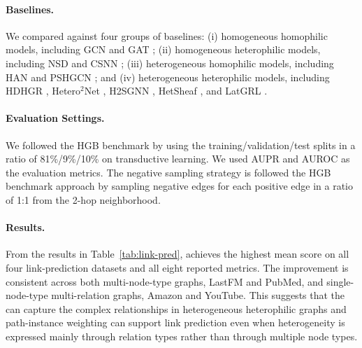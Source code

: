 \paragraph{Baselines.} We compared \method{} against four groups of baselines: (i) homogeneous homophilic models, including GCN \cite{kipf2017gcn} and GAT \cite{velickovic2018gat}; (ii) homogeneous heterophilic models, including NSD \cite{bodnar2022neural} and CSNN \cite{ribeiro2026cooperative}; (iii) heterogeneous homophilic models, including HAN \cite{wang2019han} and PSHGCN \cite{he2024spectral}; and (iv) heterogeneous heterophilic models, including HDHGR \cite{guo2023homophily}, Hetero$^2$Net \cite{li2025hetero2net}, H2SGNN \cite{lu2026addressing}, HetSheaf \cite{braithwaite2024heterogeneous}, and LatGRL \cite{shen2025heterophily}.

\paragraph{Evaluation Settings.} We followed the HGB benchmark \cite{lv2021hgb} by using the training/validation/test splits in a ratio of 81\%/9\%/10\% on transductive learning. We used AUPR and AUROC as the evaluation metrics. The negative sampling strategy is followed the HGB benchmark approach \cite{lv2021hgb} by sampling negative edges for each positive edge in a ratio of 1:1 from the 2-hop neighborhood. 

\paragraph{Results.} From the results in Table~\ref{tab:link-pred}, \method{} achieves the highest mean score on all four link-prediction datasets and all eight reported metrics. The improvement is consistent across both multi-node-type graphs, LastFM and PubMed, and single-node-type multi-relation graphs, Amazon and YouTube. This suggests that the \method{} can capture the complex relationships in heterogeneous heterophilic graphs and \ampss{} path-instance weighting can support link prediction even when heterogeneity is expressed mainly through relation types rather than through multiple node types.

